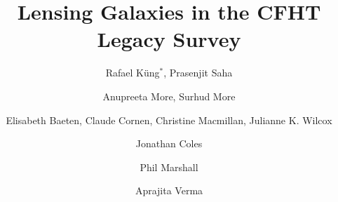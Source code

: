 \documentclass{ws-procs975x65}
\begin{document}
\title{Lensing Galaxies in the CFHT Legacy Survey}

\author{
  Rafael Küng$^*$, Prasenjit Saha
}
\address{
Physik-Institut, University of Zürich,\\
Winterthurerstrasse 190, 8057 Zürich, Switzerland\\
$^*$E-mail: rafael\_kueng@uzh.ch
}
\author{
  Anupreeta More, Surhud More
}
\address{
  Kavli Institute for the Physics and Mathematics of the Universe, University of Tokyo\\ 5-1-5 Kashiwanoha, Kashiwa-shi 277-8583, Japan
}

\author{
  Elisabeth Baeten, Claude Cornen, Christine Macmillan, Julianne K. Wilcox
}
\address{
  Zooniverse, c/o Astrophysics Department, University of Oxford\\
  Oxford OX1 3RH, UK
}

\author{
  Jonathan Coles
}
\address{
  Exascale Research Computing Lab, Campus Teratec,\\
  2 Rue de la Piquetterie, 91680 Bruyeres-le-Chatel, France
}

\author{
  Phil Marshall
}
\address{
  Kavli Institute for Particle Astrophysics and Cosmology, Stanford University\\
  452 Lomita Mall, Stanford, CA 94035, USA
}

\author{
  Aprajita Verma
}
\address{
  Sub-department of Astrophysics, University of Oxford, Denys Wilkinson Building\\
  Keble Road, Oxford, OX1 3RH, UK
}





% 
% 
% 
\end{document}
